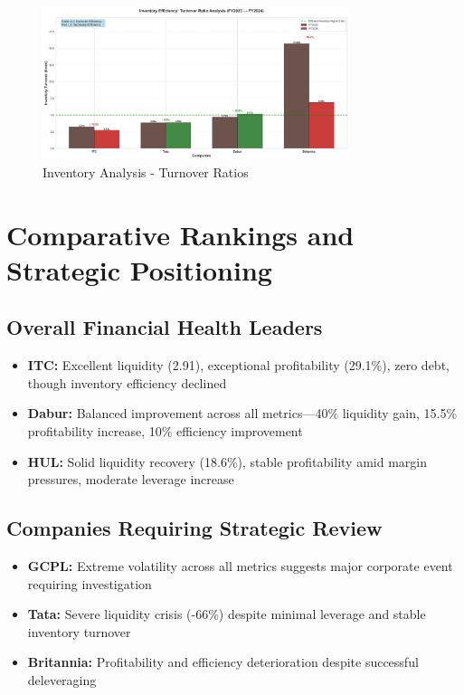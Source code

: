 \documentclass[12pt, a4paper]{report}
\begin{document}
\begin{figure}[H]
    \centering
    \includegraphics[width=0.8\textwidth]{assets/imperative_analysis/inventory_analysis.png}
    \caption{Inventory Analysis - Turnover Ratios}
\end{figure}

\vspace{0.3cm}

\section{Comparative Rankings and Strategic Positioning}

\subsection{Overall Financial Health Leaders}

\begin{itemize}
    \item \textbf{ITC:} Excellent liquidity (2.91), exceptional profitability (29.1\%), zero debt, though inventory efficiency declined
    \item \textbf{Dabur:} Balanced improvement across all metrics—40\% liquidity gain, 15.5\% profitability increase, 10\% efficiency improvement
    \item \textbf{HUL:} Solid liquidity recovery (18.6\%), stable profitability amid margin pressures, moderate leverage increase
\end{itemize}

\subsection{Companies Requiring Strategic Review}

\begin{itemize}
    \item \textbf{GCPL:} Extreme volatility across all metrics suggests major corporate event requiring investigation
    \item \textbf{Tata:} Severe liquidity crisis (-66\%) despite minimal leverage and stable inventory turnover
    \item \textbf{Britannia:} Profitability and efficiency deterioration despite successful deleveraging
\end{itemize}
\end{document}
